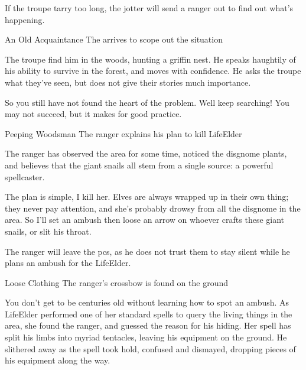 
If the troupe tarry too long, the \gls{jotter} will send a ranger out to find out what's happening.

{An Old Acquaintance}%
{The  arrives to scope out the situation}%

The troupe find him in the woods, hunting a griffin nest.
He speaks haughtily of his ability to survive in the forest, and moves with confidence.
He asks the troupe what they've seen, but does not give their stories much importance.

\begin{speechtext}
  So you still have not found the heart of the problem.
  Well keep searching!
  You may not succeed, but it makes for good practice.
\end{speechtext}

{Peeping Woodsman}%
{The ranger explains his plan to kill \gls{LifeElder}}%

The \gls{ranger} has observed the area for some time, noticed the \gls{disgnome} plants, and believes that the giant snails all stem from a single source: a powerful spellcaster.

\begin{speechtext}
  The plan is simple, I kill her.
  Elves are always wrapped up in their own thing; they never pay attention, and she's probably drowsy from all the \gls{disgnome} in the area.
  So I'll set an ambush then loose an arrow on whoever crafts these giant snails, or slit his throat.
\end{speechtext}

The \gls{ranger} will leave the \glspl{pc}, as he does not trust them to stay silent while he plans an ambush for the \gls{LifeElder}.

{Loose Clothing}%
{The ranger's crossbow is found on the ground}%

\begin{speechtext}
  You don't get to be centuries old without learning how to spot an ambush.
  As \gls{LifeElder} performed one of her standard spells to query the living things in the area, she found the ranger, and guessed the reason for his hiding.
  Her spell has split his limbs into myriad tentacles, leaving his equipment on the ground.
  He slithered away as the spell took hold, confused and dismayed, dropping pieces of his equipment along the way.
\end{speechtext}

